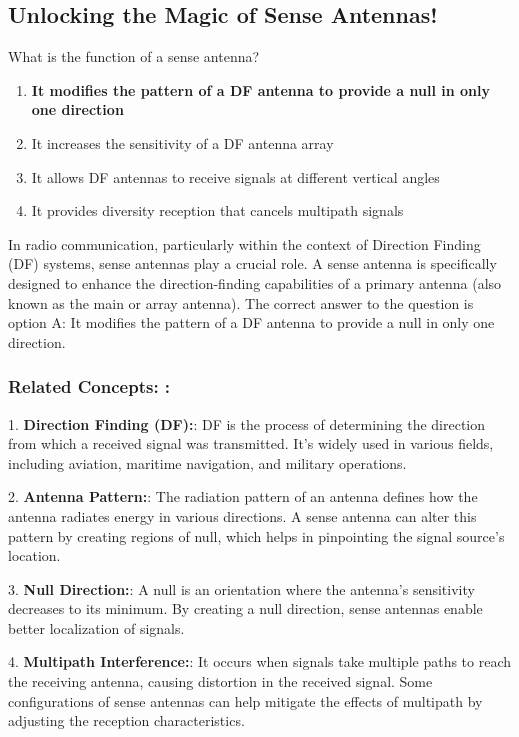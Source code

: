 \subsection{Unlocking the Magic of Sense Antennas!}

\begin{tcolorbox}[colback=gray!10, colframe=black, title=E9H08] What is the function of a sense antenna?
\begin{enumerate}[label=\Alph*.]
    \item \textbf{It modifies the pattern of a DF antenna to provide a null in only one direction}
    \item It increases the sensitivity of a DF antenna array
    \item It allows DF antennas to receive signals at different vertical angles
    \item It provides diversity reception that cancels multipath signals
\end{enumerate} \end{tcolorbox}

In radio communication, particularly within the context of Direction Finding (DF) systems, sense antennas play a crucial role. A sense antenna is specifically designed to enhance the direction-finding capabilities of a primary antenna (also known as the main or array antenna). The correct answer to the question is option A: It modifies the pattern of a DF antenna to provide a null in only one direction.

\subsubsection*{Related Concepts: :}

1. \textbf{Direction Finding (DF):}: DF is the process of determining the direction from which a received signal was transmitted. It's widely used in various fields, including aviation, maritime navigation, and military operations.

2. \textbf{Antenna Pattern:}: The radiation pattern of an antenna defines how the antenna radiates energy in various directions. A sense antenna can alter this pattern by creating regions of null, which helps in pinpointing the signal source's location.

3. \textbf{Null Direction:}: A null is an orientation where the antenna's sensitivity decreases to its minimum. By creating a null direction, sense antennas enable better localization of signals.

4. \textbf{Multipath Interference:}: It occurs when signals take multiple paths to reach the receiving antenna, causing distortion in the received signal. Some configurations of sense antennas can help mitigate the effects of multipath by adjusting the reception characteristics.

